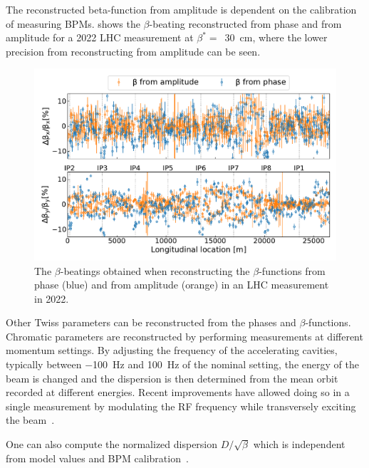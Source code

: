 The reconstructed \gls{beta-function} from amplitude is dependent on the calibration of measuring BPMs.
 shows the \(\beta\)-beating reconstructed from phase and from amplitude for a \num{2022} LHC measurement at \(\beta^{\ast} =\)~\qty{30}{\centi\meter}, where the lower precision from reconstructing from amplitude can be seen.

\begin{figure}[!htb]
  \centering
  \includegraphics*[width=\linewidth]{Figures/Optics_Measurements_Corrections_at_LHC/betabeat_phase_vs_amp.pdf}
  \caption{The \(\beta\)-beatings obtained when reconstructing the \(\beta\)-functions from phase (\textcolor{mplblue}{blue}) and from amplitude (\textcolor{mplorange}{orange}) in an LHC measurement in \num{2022}.}
  \label{figure:betabeating_phase_vs_amp}
\end{figure}

Other Twiss parameters can be reconstructed from the phases and \(\beta\)-functions.
Chromatic parameters are reconstructed by performing measurements at different momentum settings.
By adjusting the frequency of the accelerating cavities, typically between \qty{-100}{\hertz} and \qty{+100}{\hertz} of the nominal setting, the energy of the beam is changed and the dispersion is then determined from the mean orbit recorded at different energies.
Recent improvements have allowed doing so in a single measurement by modulating the RF frequency while transversely exciting the beam~\cite{PHD:Malina, IPAC:Malina:3D_Excitation}.

One can also compute the normalized dispersion \(D / \sqrt{\beta}\) which is independent from model values and BPM calibration~\cite{PAC:Calaga:BPM_Calibration_Independent_LHC_Optics_Correction}.

